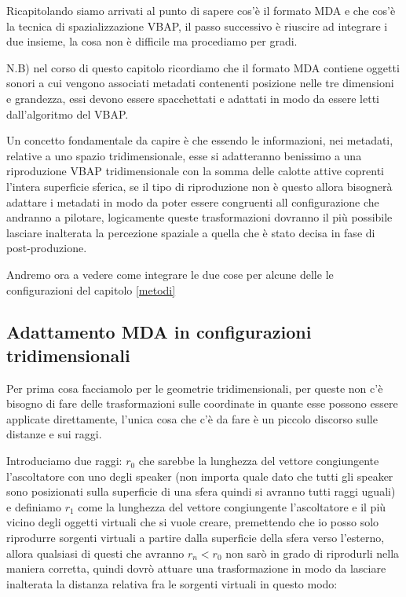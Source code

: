 \documentclass[12pt,a4paper]{report}
\begin{document}
Ricapitolando siamo arrivati al punto di sapere cos'è il formato MDA e che cos'è la tecnica di spazializzazione VBAP,
il passo successivo è riuscire ad integrare i due insieme, la cosa non è difficile ma procediamo per gradi.

N.B) nel corso di questo capitolo
ricordiamo che il formato MDA contiene oggetti sonori a cui vengono associati metadati contenenti posizione nelle tre dimensioni e grandezza, essi devono essere spacchettati e adattati in modo da essere letti dall'algoritmo del VBAP.

Un concetto fondamentale da capire è che essendo le informazioni, nei metadati, relative a uno spazio tridimensionale, esse si adatteranno benissimo a una riproduzione VBAP tridimensionale con la somma delle calotte attive coprenti l'intera superficie sferica, se il tipo di riproduzione non è questo allora bisognerà adattare i metadati in modo da poter essere congruenti all configurazione che andranno a pilotare, logicamente queste trasformazioni dovranno il più possibile lasciare inalterata la percezione spaziale a quella che è stato decisa in fase di post-produzione.

Andremo ora a vedere come integrare le due cose per alcune delle le configurazioni del capitolo \ref{metodi}

\subsection{Adattamento MDA in configurazioni tridimensionali}

Per prima cosa facciamolo per le geometrie tridimensionali, per queste non c'è bisogno di fare delle trasformazioni sulle coordinate in quante esse possono essere applicate direttamente, l'unica cosa che c'è da fare è un piccolo discorso sulle distanze e sui raggi.

Introduciamo due raggi: $r_0$ che sarebbe la lunghezza del vettore congiungente l'ascoltatore con uno degli speaker (non importa quale dato che tutti gli speaker sono posizionati sulla superficie di una sfera quindi si avranno tutti raggi uguali) e definiamo $r_1$ come la lunghezza del vettore congiungente l'ascoltatore e il più vicino degli oggetti virtuali che si vuole creare, premettendo che io posso solo riprodurre sorgenti virtuali a partire dalla superficie della sfera verso l'esterno, allora qualsiasi di questi che avranno $r_n < r_0$ non sarò in grado di riprodurli nella maniera corretta, quindi dovrò attuare una trasformazione in modo da lasciare inalterata la distanza relativa fra le sorgenti virtuali in questo modo:
\end{document}
